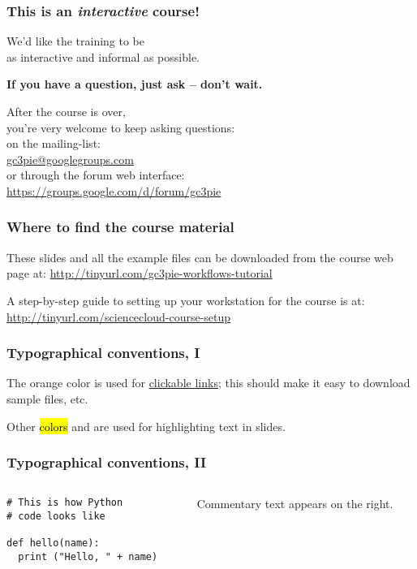 \documentclass[english,serif,mathserif,xcolor=pdftex,dvipsnames,table]{beamer}
\begin{document}
\begin{frame}
  \frametitle{This is an \emph{interactive} course!}
  \begin{center}
    We'd like the training to be \\ as interactive and informal as
    possible.

    \+ \textbf{If you have a question, just ask -- don't wait.}

    \+
    After the course is over, \\ you're very welcome to keep asking questions:
    \\[1ex]
    on the mailing-list: \\
    \href{mailto:gc3pie@googlegroups.com}{gc3pie@googlegroups.com}
    \\[1ex]
    or through the forum web interface: \\
    {\small \url{https://groups.google.com/d/forum/gc3pie}}
  \end{center}
\end{frame}


\begin{frame}
  \frametitle{Where to find the course material}

  These slides and all the example files can be downloaded from the
  course web page at:
  {\small\url{http://tinyurl.com/gc3pie-workflows-tutorial}}

  \+
  A step-by-step guide to setting up your workstation for the course is at:
  {\small\url{http://tinyurl.com/sciencecloud-course-setup}}
\end{frame}


\begin{frame}
  \frametitle{Typographical conventions, I}

  The orange color is used for
  \href{http://tinyurl.com/gc3pie-july-2016}{clickable
    links}; this should make it easy to download sample files, etc.

  \+
  Other \hl{colors} and  are used for highlighting
  text in slides.
\end{frame}


\begin{frame}[fragile]
  \frametitle{Typographical conventions, II}

    \begin{columns}[t]
    \begin{column}{0.5\textwidth}
\begin{lstlisting}
# This is how Python
# code looks like

def hello(name):
  print ("Hello, " + name)
\end{lstlisting}
    \end{column}
    \begin{column}{0.5\textwidth}
      \raggedleft Commentary text appears on the right.
    \end{column}
  \end{columns}
\end{frame}
\end{document}
